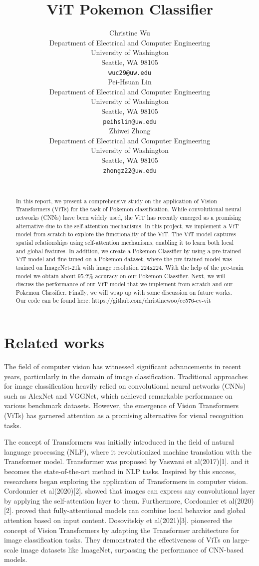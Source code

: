 \documentclass{article} %
\title{ViT Pokemon Classifier}
\author{
Christine Wu\\
Department of Electrical and Computer Engineering\\
University of Washington\\
Seattle, WA 98105 \\
\texttt{wuc29@uw.edu} \\
\And
Pei-Hsuan Lin \\
Department of Electrical and Computer Engineering\\
University of Washington\\
Seattle, WA 98105 \\
\texttt{peihslin@uw.edu} \\
\AND
Zhiwei Zhong \\
Department of Electrical and Computer Engineering\\
University of Washington\\
Seattle, WA 98105 \\
\texttt{zhongz22@uw.edu} \\
\\
}
\begin{document}
\maketitle

\begin{abstract}
In this report, we present a comprehensive study on the application of Vision Transformers 
(ViTs) for the task of Pokemon classification. While convolutional neural networks (CNNs) 
have been widely used, the ViT has recently emerged as a promising alternative due to the 
self-attention mechanisms. In this project, we implement a ViT model from scratch to explore
the functionality of the ViT. The ViT model captures spatial relationships using 
self-attention mechanisms, enabling it to learn both local and global features. 
In addition, we create a Pokemon Classifier by using a pre-trained ViT model and fine-tuned on
a Pokemon dataset, where the pre-trained model was trained on ImageNet-21k with image resolution 224x224. 
With the help of the pre-train model we obtain about $95.2\%$ accuracy on our Pokemon Classifier. Next, 
we will discuss the performance of our ViT model that we implement from scratch and our Pokemon Classifier.
Finally, we will wrap up with some discussion on future works. \\
Our code can be found here: https://github.com/christinewoo/ee576-cv-vit
\end{abstract}

\section{Related works}
The field of computer vision has witnessed significant advancements in recent years, 
particularly in the domain of image classification. Traditional approaches for image 
classification heavily relied on convolutional neural networks (CNNs) such as AlexNet 
and VGGNet, which achieved remarkable performance on various benchmark datasets. However, 
the emergence of Vision Transformers (ViTs) has garnered attention as a promising 
alternative for visual recognition tasks.

The concept of Transformers was initially introduced in the field of natural language 
processing (NLP), where it revolutionized machine translation with the Transformer model. 
Transformer was proposed by Vaswani et al(2017)[1]. and it becomes the state-of-the-art 
method in NLP tasks. Inspired by this success, researchers began exploring the application 
of Transformers in computer vision. Cordonnier et al(2020)[2]. showed that images can express 
any convolutional layer by applying the self-attention layer to them. Furthermore, 
Cordonnier et al(2020)[2]. proved that fully-attentional models can combine local behavior 
and global attention based on input content. Dosovitskiy et al(2021)[3]. pioneered the 
concept of Vision Transformers by adapting the Transformer architecture for image 
classification tasks. They demonstrated the effectiveness of ViTs on large-scale image 
datasets like ImageNet, surpassing the performance of CNN-based models.
\end{document}
